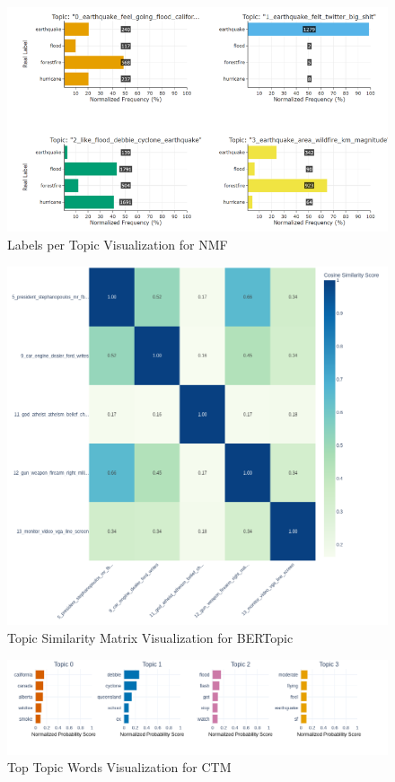 \documentclass[11pt]{article}
\begin{document}
\begin{figure}[ht]
\includegraphics[width=16cm]{Figures/labels_per_topic.png}
\centering
\caption{Labels per Topic Visualization for NMF}
\label{fig:labels per topic}
\end{figure}

\begin{figure}[ht]
\includegraphics[width=17cm]{Figures/bertopic_topic_sim_matrix_20news}
\centering
\caption{Topic Similarity Matrix Visualization for BERTopic}
\label{fig:topic_similarity_matrix}
\end{figure}


\begin{figure}[ht]
\includegraphics[width=14cm]{Figures/ctm_topic_words_crisis_12.png}
\centering
\caption{Top Topic Words Visualization for CTM}
\label{fig:topic words}
\end{figure}
\end{document}
